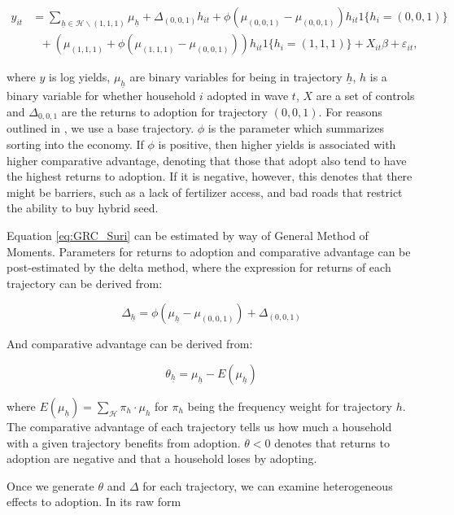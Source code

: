 \documentclass{article}
\begin{document}
\begin{align}
y_{it}&=\sum_{\underline{h}\in\mathcal{H}\backslash (1,1,1)}\mu_{\underline{h}}+\Delta_{(0,0,1)}h_{it}+\phi(\mu_{(0,0,1)}-\mu_{(0,0,1)})h_{it}1\{h_{i}=(0,0,1)\}\nonumber\\
&~~~+\left(\mu_{(1,1,1)}+\phi\left(\mu_{(1,1,1)}-\mu_{(0,0,1)}\right)\right)h_{it}1\{h_{i}=(1,1,1)\} + X_{it}\beta +\varepsilon_{it},\label{eq:GRC_Suri}
\end{align}

where $y$ is log yields, $\mu_{\underline{h}}$ are binary variables for being in trajectory $\underline{h}$, $h$ is a binary variable for whether household $i$ adopted in wave $t$, $X$ are a set of controls and $\Delta_{0,0,1}$ are the returns to adoption for trajectory $(0,0,1)$. For reasons outlined in \cite{Tjernstrom_Emilia_Dalia_Ghanem_Oscar_Barriga_Cabanillas_Travis_J_Lybbert_Jeffrey_D_Michler_and_Aleksandr_Michuda2020-bc}, we use a base trajectory. $\phi$ is the parameter which summarizes sorting into the economy. If $\phi$ is positive, then higher yields is associated with higher comparative advantage, denoting that those that adopt also tend to have the highest returns to adoption. If it is negative, however, this denotes that there might be barriers, such as a lack of fertilizer access, and bad roads that restrict the ability to buy hybrid seed.

Equation \ref{eq:GRC_Suri} can be estimated by way of General Method of Moments. Parameters for returns to adoption and comparative advantage can be post-estimated by the delta method, where the expression for returns of each trajectory can be derived from:

$$
\Delta_{\underline{h}}=\phi\left(\mu_{\underline{h}}-\mu_{(0,0,1)}\right) + \Delta_{(0,0,1)}
$$

And comparative advantage can be derived from:

$$
\theta_{\underline{h}} = \mu_{\underline{h}} - E(\mu_{\underline{h}})
$$

where $E(\mu_{\underline{h}}) = \sum_{\mathcal{H}} \pi_h \cdot \mu_h$ for $\pi_h$ being the frequency weight for trajectory $h$. The comparative advantage of each trajectory tells us how much a household with a given trajectory benefits from adoption. $\theta <0 $ denotes that returns to adoption are negative and that a household loses by adopting.

Once we generate $\theta$ and $\Delta$ for each trajectory, we can examine heterogeneous effects to adoption. In its raw form
\end{document}
